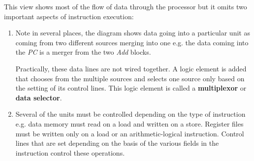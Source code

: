 \documentclass[10pt,a4paper]{article}
\begin{document}
This view shows most of the flow of data through the processor but it omits two important aspects of
instruction execution:
\begin{enumerate}
    \item Note in several places, the diagram shows data going into a particular unit as coming from
    two different sources merging into one e.g. the data coming into the \textit{PC} is a merger
    from the two \textit{Add} blocks.

    Practically, these data lines are not wired together. A logic element is added that chooses from 
    the multiple sources and selects one source only based on the setting of its control lines. This
    logic element is called a \textbf{multiplexor} or \textbf{data selector}.
    \item Several of the units must be controlled depending on the type of instruction e.g. data
    memory must read on a load and written on a store. Register files must be written only on
    a load or an arithmetic-logical instruction. Control lines that are set depending on the basis
    of the various fields in the instruction control these operations.
\end{enumerate}
\end{document}
